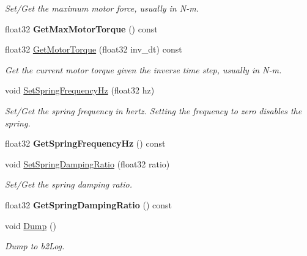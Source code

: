 \begin{DoxyCompactItemize}
\begin{DoxyCompactList}\small\item\em Set/\-Get the maximum motor force, usually in N-\/m. \end{DoxyCompactList}\item 
\hypertarget{classb2_wheel_joint_ad2d9fb270f0a62cd87234d3ce55626f3}{float32 {\bfseries Get\-Max\-Motor\-Torque} () const }\label{classb2_wheel_joint_ad2d9fb270f0a62cd87234d3ce55626f3}

\item 
\hypertarget{classb2_wheel_joint_a4fbfb199ed267f7a2fad934cd2f4fbdc}{float32 \hyperlink{classb2_wheel_joint_a4fbfb199ed267f7a2fad934cd2f4fbdc}{Get\-Motor\-Torque} (float32 inv\-\_\-dt) const }\label{classb2_wheel_joint_a4fbfb199ed267f7a2fad934cd2f4fbdc}

\begin{DoxyCompactList}\small\item\em Get the current motor torque given the inverse time step, usually in N-\/m. \end{DoxyCompactList}\item 
\hypertarget{classb2_wheel_joint_af9f8fada5cb30f83aa2fbf486e9d347b}{void \hyperlink{classb2_wheel_joint_af9f8fada5cb30f83aa2fbf486e9d347b}{Set\-Spring\-Frequency\-Hz} (float32 hz)}\label{classb2_wheel_joint_af9f8fada5cb30f83aa2fbf486e9d347b}

\begin{DoxyCompactList}\small\item\em Set/\-Get the spring frequency in hertz. Setting the frequency to zero disables the spring. \end{DoxyCompactList}\item 
\hypertarget{classb2_wheel_joint_a475fe44e145a7e3869c0a0ff5602bb20}{float32 {\bfseries Get\-Spring\-Frequency\-Hz} () const }\label{classb2_wheel_joint_a475fe44e145a7e3869c0a0ff5602bb20}

\item 
\hypertarget{classb2_wheel_joint_a39b123ac045c8ec93faa65746e6655dc}{void \hyperlink{classb2_wheel_joint_a39b123ac045c8ec93faa65746e6655dc}{Set\-Spring\-Damping\-Ratio} (float32 ratio)}\label{classb2_wheel_joint_a39b123ac045c8ec93faa65746e6655dc}

\begin{DoxyCompactList}\small\item\em Set/\-Get the spring damping ratio. \end{DoxyCompactList}\item 
\hypertarget{classb2_wheel_joint_ad991b903dd8b3820dfe3a2263b89f5aa}{float32 {\bfseries Get\-Spring\-Damping\-Ratio} () const }\label{classb2_wheel_joint_ad991b903dd8b3820dfe3a2263b89f5aa}

\item 
\hypertarget{classb2_wheel_joint_a09534b6f4c5d0254711e0bcc7cf3b0e4}{void \hyperlink{classb2_wheel_joint_a09534b6f4c5d0254711e0bcc7cf3b0e4}{Dump} ()}\label{classb2_wheel_joint_a09534b6f4c5d0254711e0bcc7cf3b0e4}

\begin{DoxyCompactList}\small\item\em Dump to b2\-Log. \end{DoxyCompactList}\end{DoxyCompactItemize}
